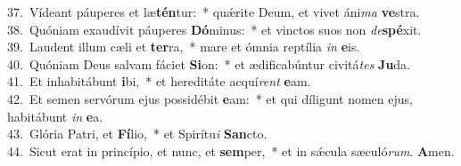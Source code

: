 {37.~}Vídeant páuperes et læ\textbf{tén}tur:~* quǽrite Deum, et vivet áni\textit{ma} \textbf{ve}stra.\\
{38.~}Quóniam exaudívit páuperes \textbf{Dó}minus:~* et vinctos suos non \textit{de}\textbf{spé}xit.\\
{39.~}Laudent illum cæli et \textbf{ter}ra,~* mare et ómnia reptília \textit{in} \textbf{e}is.\\
{40.~}Quóniam Deus salvam fáciet \textbf{Si}on:~* et ædificabúntur civitá\textit{tes} \textbf{Ju}da.\\
{41.~}Et inhabitábunt \textbf{i}bi,~* et hereditáte acquí\textit{rent} \textbf{e}am.\\
{42.~}Et semen servórum ejus possidébit \textbf{e}am:~* et qui díligunt nomen ejus, habitábunt \textit{in} \textbf{e}a.\\
{43.~}Glória Patri, et \textbf{Fí}lio,~* et Spirítu\textit{i} \textbf{San}cto.\\
{44.~}Sicut erat in princípio, et nunc, et \textbf{sem}per,~* et in sǽcula sæculó\textit{rum}. \textbf{A}men.\\
